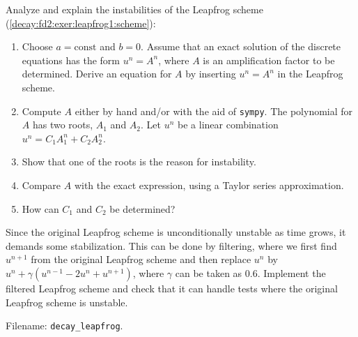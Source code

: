 \documentclass[graybox,sectrefs,envcountresetchap,open=right,final]{svmonodo}
\newenvironment{doconceexercise}{}{}
\begin{document}
\begin{doconceexercise}

Analyze and explain the
instabilities of the Leapfrog scheme (\ref{decay:fd2:exer:leapfrog1:scheme}):

\begin{enumerate}
\item Choose $a=\mbox{const}$ and $b=0$. Assume that an exact solution of the discrete equations has the form $u^n=A^n$, where $A$ is an amplification factor to be determined. Derive an equation for $A$ by inserting $u^n=A^n$ in the Leapfrog scheme.

\item Compute $A$ either by hand and/or with the aid of \texttt{sympy}. The polynomial for $A$ has two roots, $A_1$ and $A_2$. Let $u^n$ be a linear combination $u^n=C_1A_1^n + C_2A_2^n$.

\item Show that one of the roots is the reason for instability.

\item Compare $A$ with the exact expression, using a Taylor series approximation.

\item How can $C_1$ and $C_2$ be determined?
\end{enumerate}

\noindent

Since the original Leapfrog scheme is unconditionally unstable as time
grows, it demands some stabilization.  This can be done by filtering,
where we first find $u^{n+1}$ from the original Leapfrog scheme and
then replace $u^{n}$ by $u^n + \gamma (u^{n-1} - 2u^n +
u^{n+1})$, where $\gamma$ can be taken as 0.6.  Implement the filtered
Leapfrog scheme and check that it can handle tests where the original
Leapfrog scheme is unstable.


\noindent Filename: \Verb!decay_leapfrog!.

\end{doconceexercise}
\end{document}

